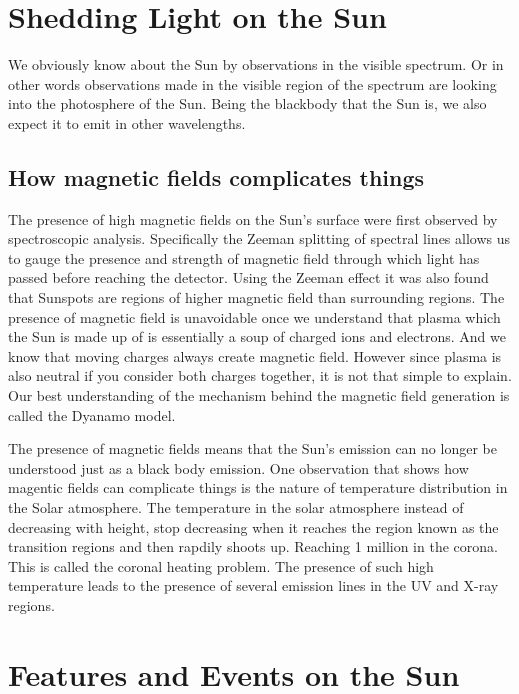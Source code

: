 \documentclass{../template/texnote}
\begin{document}
\section{Shedding Light on the Sun}
We obviously know about the Sun by observations in the visible spectrum. 
Or in other words observations made in the visible region of the spectrum are looking into the photosphere of the Sun.
Being the blackbody that the Sun is, we also expect it to emit in other wavelengths.


\subsection{How magnetic fields complicates things}
The presence of high magnetic fields on the Sun's surface were first observed by spectroscopic analysis.
Specifically the Zeeman splitting of spectral lines allows us to gauge the presence and strength of magnetic field through which light has passed before reaching the detector.
Using the Zeeman effect it was also found that Sunspots are regions of higher magnetic field than surrounding regions.
The presence of magnetic field is unavoidable once we understand that plasma which the Sun is made up of is essentially a soup of charged ions and electrons.
And we know that moving charges always create magnetic field.
However since plasma is also neutral if you consider both charges together, it is not that simple to explain.
Our best understanding of the mechanism behind the magnetic field generation is called the Dyanamo model.

The presence of magnetic fields means that the Sun's emission can no longer be understood just as a black body emission.
One observation that shows how magentic fields can complicate things is the nature of temperature distribution in the Solar atmosphere.
The temperature in the solar atmosphere instead of decreasing with height, stop decreasing when it reaches the region known as the transition regions and then rapdily shoots up. Reaching 1 million in the corona. This is called the coronal heating problem.
The presence of such high temperature leads to the presence of several emission lines in the UV and X-ray regions.

\section{Features and Events on the Sun}
\end{document}
